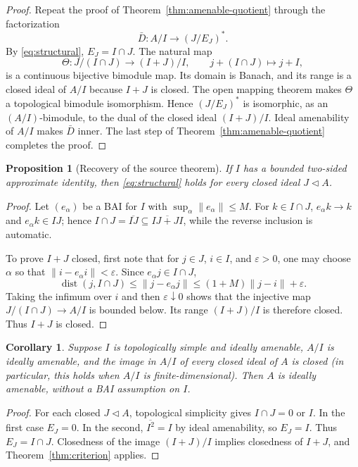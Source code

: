 \documentclass[11pt]{article}
\newtheorem{proposition}[theorem]{Proposition}
\newtheorem{corollary}[theorem]{Corollary}
\newcommand{\cl}{\overline}
\begin{document}
\begin{proof}
Repeat the proof of Theorem~\ref{thm:amenable-quotient} through the
factorization
\[
 \bar D:A/I\longrightarrow (J/E_J)^*.
\]
By \eqref{eq:structural}, $E_J=I\cap J$.  The natural map
\[
 \Theta:J/(I\cap J)\longrightarrow (I+J)/I,
 \qquad j+(I\cap J)\longmapsto j+I,
\]
is a continuous bijective bimodule map.  Its domain is Banach, and its
range is a closed ideal of $A/I$ because $I+J$ is closed.  The open mapping
theorem makes $\Theta$ a topological bimodule isomorphism.  Hence
$(J/E_J)^*$ is isomorphic, as an $(A/I)$-bimodule, to the dual of the closed
ideal $(I+J)/I$.  Ideal amenability of $A/I$ makes $\bar D$ inner.  The last
step of Theorem~\ref{thm:amenable-quotient} completes the proof.
\end{proof}

\begin{proposition}[Recovery of the source theorem]\label{prop:bai}
If $I$ has a bounded two-sided approximate identity, then
\eqref{eq:structural} holds for every closed ideal $J\triangleleft A$.
\end{proposition}

\begin{proof}
Let $(e_\alpha)$ be a BAI for $I$ with $\sup_\alpha\|e_\alpha\|\le M$.
For $k\in I\cap J$, $e_\alpha k\to k$ and $e_\alpha k\in IJ$; hence
$I\cap J=\cl{IJ}\subseteq\cl{IJ+JI}$, while the reverse inclusion is
automatic.

To prove $I+J$ closed, first note that for $j\in J$, $i\in I$, and
$\varepsilon>0$, one may choose $\alpha$ so that
$\|i-e_\alpha i\|<\varepsilon$.  Since $e_\alpha j\in I\cap J$,
\[
 \operatorname{dist}(j,I\cap J)
 \le \|j-e_\alpha j\|
 \le (1+M)\|j-i\|+\varepsilon.
\]
Taking the infimum over $i$ and then $\varepsilon\downarrow0$ shows that
the injective map
$J/(I\cap J)\to A/I$ is bounded below.  Its range $(I+J)/I$ is therefore
closed.  Thus $I+J$ is closed.
\end{proof}

\begin{corollary}\label{cor:simple}
Suppose $I$ is topologically simple and ideally amenable, $A/I$ is ideally
amenable, and the image in $A/I$ of every closed ideal of $A$ is closed
(in particular, this holds when $A/I$ is finite-dimensional).  Then $A$ is
ideally amenable, without a BAI assumption on $I$.
\end{corollary}

\begin{proof}
For each closed $J\triangleleft A$, topological simplicity gives
$I\cap J=0$ or $I$.  In the first case $E_J=0$.  In the second,
$\cl{I^2}=I$ by ideal amenability, so $E_J=I$.  Thus
$E_J=I\cap J$.  Closedness of the image $(I+J)/I$ implies closedness of
$I+J$, and Theorem~\ref{thm:criterion} applies.
\end{proof}
\end{document}
